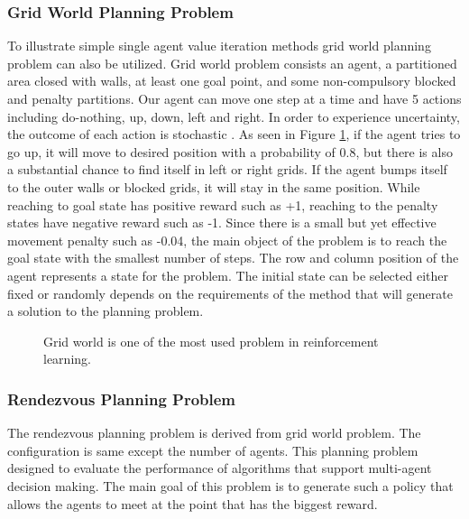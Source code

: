 \documentclass{ituphdreport}
\begin{document}
\subsubsection{Grid World Planning Problem} \label{sec:gridworldproblem}
To illustrate simple single agent value iteration methods grid world planning problem can also be utilized. Grid world problem consists an agent, a partitioned area closed with walls, at least one goal point, and some non-compulsory blocked and penalty partitions. Our agent can move one step at a time and have 5 actions including do-nothing, up, down, left and right. In order to experience uncertainty, the outcome of each action is stochastic \cite{kochenderfer2015decision}. As seen in Figure \ref{fig:gridworld}, if the agent tries to go up, it will move to desired position with a probability of 0.8, but there is also a substantial chance to find itself in left or right grids. If the agent bumps itself to the outer walls or blocked grids, it will stay in the same position. While reaching to goal state has positive reward such as +1, reaching to the penalty states have negative reward such as -1.  Since there is a small but yet effective movement penalty such as -0.04, the main object of the problem is to reach the goal state with the smallest number of steps. The row and column position of the agent represents a state for the problem. The initial state can be selected either fixed or randomly depends on the requirements of the method that will generate a solution to the planning problem. 

\begin{figure}[h]
	\begin{center}
	\end{center}
	\caption{Grid world is one of the most used problem in reinforcement learning. 
		\label{fig:gridworld}}
\end{figure}

\subsubsection{Rendezvous Planning Problem} \label{sec:rendezvousproblem}
The rendezvous planning problem is derived from grid world problem. The configuration is same except the number of agents. This planning problem designed to evaluate the performance of algorithms that support multi-agent decision making. The main goal of this problem is to generate such a policy that allows the agents to meet at the point that has the biggest reward. 
\end{document}
